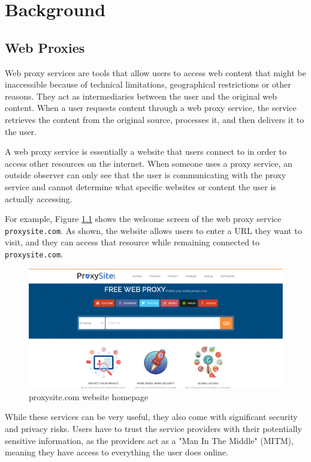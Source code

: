 \chapter{Background}\label{ch:sample-chapter}

\section{Web Proxies}
Web proxy services are tools that allow users to access web content that might be inaccessible because of technical limitations, geographical restrictions or other reasons. They act as intermediaries between the user and the original web content. When a user requests content through a web proxy service, the service retrieves the content from the original source, processes it, and then delivers it to the user. 

A web proxy service is essentially a website that users connect to in order to access other resources on the internet. When someone uses a proxy service, an outside observer can only see that the user is communicating with the proxy service and cannot determine what specific websites or content the user is actually accessing.

For example, Figure \ref{fig:proxy-site} shows the welcome screen of the web proxy service \texttt{proxysite.com}. As shown, the website allows users to enter a URL they want to visit, and they can access that resource while remaining connected to \texttt{proxysite.com}.

\begin{figure}
    \centering
    \includegraphics[width=1\linewidth]{media/proxy-site.png}
    \caption{proxysite.com website homepage}
    \label{fig:proxy-site}
\end{figure}

While these services can be very useful, they also come with significant security and privacy risks. Users have to trust the service providers with their potentially sensitive information, as the providers act as a "Man In The Middle" (MITM), meaning they have access to everything the user does online.

